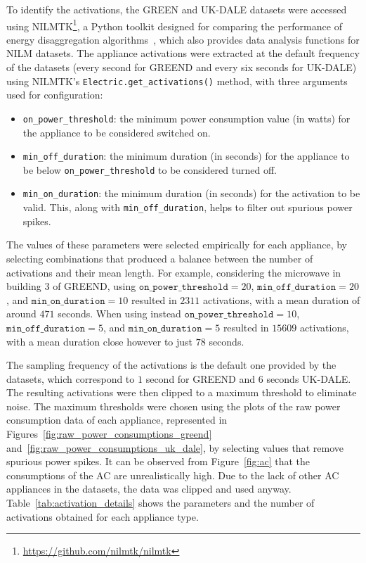 To identify the activations, the GREEN and UK-DALE datasets were accessed using NILMTK\footnote{\url{https://github.com/nilmtk/nilmtk}}, a Python toolkit designed for comparing the performance of energy disaggregation algorithms~\parencite{batraItDifferentInsights2013}, which also provides data analysis functions for NILM datasets. The appliance activations were extracted at the default frequency of the datasets (every second for GREEND and every six seconds for UK-DALE) using NILMTK's \texttt{Electric.get\_activations()} method, with three arguments used for configuration:
\begin{itemize}
  \item \texttt{on\_power\_threshold}: the minimum power consumption value (in watts) for the appliance to be considered switched on.
  \item \texttt{min\_off\_duration}: the minimum duration (in seconds) for the appliance to be below \texttt{on\_power\_threshold} to be considered turned off.
  \item \texttt{min\_on\_duration}: the minimum duration (in seconds) for the activation to be valid. This, along with \texttt{min\_off\_duration}, helps to filter out spurious power spikes.
\end{itemize}
The values of these parameters were selected empirically for each appliance, by selecting combinations that produced a balance between the number of activations and their mean length. For example, considering the microwave in building 3 of GREEND, using $\texttt{on\_power\_threshold} = 20$, $\texttt{min\_off\_duration} = 20$, and $\texttt{min\_on\_duration} = 10$ resulted in $2311$ activations, with a mean duration of around $471$ seconds. When using instead $\texttt{on\_power\_threshold} = 10$, $\texttt{min\_off\_duration} = 5$, and $\texttt{min\_on\_duration} = 5$ resulted in $15609$ activations, with a mean duration close however to just $78$ seconds.

\newpage

The sampling frequency of the activations is the default one provided by the datasets, which correspond to $1$ second for GREEND and $6$ seconds UK-DALE. The resulting activations were then clipped to a maximum threshold to eliminate noise. The maximum thresholds were chosen using the plots of the raw power consumption data of each appliance, represented in Figures~\ref{fig:raw_power_consumptions_greend} and~\ref{fig:raw_power_consumptions_uk_dale}, by selecting values that remove spurious power spikes. It can be observed from Figure~\ref{fig:ac} that the consumptions of the AC are unrealistically high. Due to the lack of other AC appliances in the datasets, the data was clipped and used anyway. Table~\ref{tab:activation_details} shows the parameters and the number of activations obtained for each appliance type.

